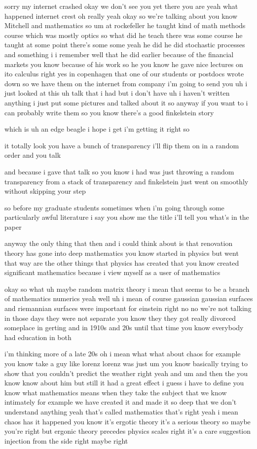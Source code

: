 \begin{description}
sorry my internet crashed okay we don't see you yet there you are yeah what happened internet crest oh really yeah okay so we're talking about you know Mitchell and mathematics so um at rockefeller he taught kind of math methods course which was mostly optics so what did he teach there was some course he taught at some point there's some some yeah he did he did stochastic processes and something i i remember well that he did earlier because of the financial markets you know because of his work so he you know he gave nice lectures on ito calculus right yes in copenhagen that one of our students or postdocs wrote down so we have them on the internet from company i'm going to send you uh i just looked at this uh talk that i had but i don't have uh i haven't written anything i just put some pictures and talked about it so anyway if you want to i can probably write them so you know there's a good finkelstein story

which is uh an edge beagle i hope i get i'm getting it right so

it totally look you have a bunch of transparency i'll flip them on in a random order and you talk

and because i gave that talk so you know i had was just throwing a random transparency from a stack of transparency and finkelstein just went on smoothly without skipping your step

so before my graduate students sometimes when i'm going through some particularly awful literature i say you show me the title i'll tell you what's in the paper

anyway the only thing that then and i could think about is that renovation theory has gone into deep mathematics you know started in physics but went that way are the other things that physics has created that you know created significant mathematics because i view myself as a user of mathematics

okay so what uh maybe random matrix theory i mean that seems to be a branch of mathematics numerics yeah well uh i mean of course gaussian gaussian surfaces and riemannian surfaces were important for einstein right no no we're not talking in those days they were not separate you know they they got really divorced someplace in gerting and in 1910s and 20s until that time you know everybody had education in both

i'm thinking more of a late 20s oh i mean what what about chaos for example you know take a guy like lorenz lorenz was just um you know basically trying to show that you couldn't predict the weather right yeah and um and then the you know know about him but still it had a great effect i guess i have to define you know what mathematics means when they take the subject that we know intimately for example we have created it and made it so deep that we don't understand anything yeah that's called mathematics that's right yeah i mean chaos has it happened you know it's ergotic theory it's a serious theory so maybe you're right but ergonic theory precedes physics scales right it's a care suggestion injection from the side right maybe right


\end{description}

